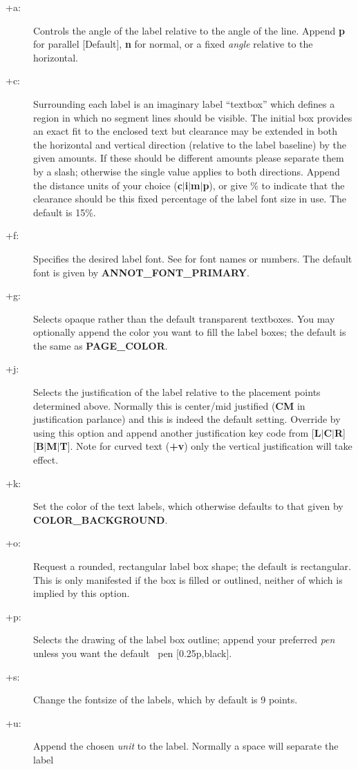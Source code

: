 \begin{description}
\item [+a:]  Controls the angle of the label relative to the angle of the line.  Append {\bf p}
for parallel [Default], {\bf n} for normal, or a fixed {\it angle} relative to the
horizontal.
\item [+c:] Surrounding each label is an imaginary label ``textbox'' which defines a region in
which no segment lines should be visible.  The initial box provides an exact fit to the enclosed
text but clearance may be extended in both the horizontal and vertical direction (relative to the label
baseline) by the given amounts.  If these should be different amounts please separate them by
a slash; otherwise the single value applies to both directions.  Append the distance units of
your choice ({\bf c$|$i$|$m$|$p}), or give \% to indicate that the clearance should be this
fixed percentage of the label font size in use.  The default is 15\%.
\item [+f:] Specifies the desired label font.  See  for font names or numbers.  The
default font is given by {\bf ANNOT\_FONT\_PRIMARY}.
\item [+g:] Selects opaque rather than the default transparent textboxes.  You may optionally append
the color you want to fill the label boxes; the default is the same as {\bf PAGE\_COLOR}.
\item [+j:] Selects the justification of the label relative to the placement points determined
above.  Normally this is center/mid justified ({\bf CM} in  justification parlance) and
this is indeed the default setting.  Override by using this option and append another justification
key code from [{\bf L$|$C$|$R}][{\bf B$|$M$|$T}].  Note for curved text ({\bf +v}) only the vertical
justification will take effect.
\item [+k:] Set the color of the text labels, which otherwise defaults to that given by {\bf COLOR\_BACKGROUND}.
\item [+o:] Request a rounded, rectangular label box shape; the default is rectangular.  This is only
manifested if the box is filled or outlined, neither of which is implied by this option.
\item [+p:] Selects the drawing of the label box outline; append your preferred {\it pen} unless you
want the default \GMT\ pen [0.25p,black].
\item [+s:] Change the fontsize of the labels, which by default is 9 points.
\item [+u:] Append the chosen {\it unit} to the label.  Normally a space will separate the label

\end{description}
